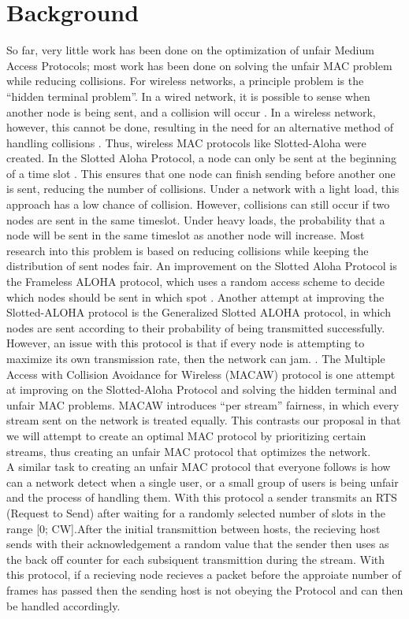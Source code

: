 \documentclass{sigcomm-alternate}
\begin{document}
\section{Background}
{
So far, very little work has been done on the optimization of unfair Medium Access Protocols; most work has been done on solving the unfair MAC problem while reducing collisions. For wireless networks, a principle problem is the “hidden terminal problem”. In a wired network, it is possible to sense when another node is being sent, and a collision will occur \cite{869217}. In a wireless network, however, this cannot be done, resulting in the need for an alternative method of handling collisions \cite{6574961}. Thus, wireless MAC protocols like Slotted-Aloha were created.  In the Slotted Aloha Protocol, a node can only be sent at the beginning of a time slot \cite{5340799}. This ensures that one node can finish sending before another one is sent, reducing the number of collisions.  Under a network with a light load, this approach has a low chance of collision. However, collisions can still occur if two nodes are sent in the same timeslot. Under heavy loads, the probability that a node will be sent in the same timeslot as another node will increase. Most research into this problem is based on reducing collisions while keeping the distribution of sent nodes fair.  An improvement on the Slotted Aloha Protocol is the Frameless ALOHA protocol, which uses a random access scheme to decide which nodes should be sent in which spot \cite{6336861}. Another attempt at improving the Slotted-ALOHA protocol is the Generalized Slotted ALOHA protocol, in which nodes are sent according to their probability of being transmitted successfully. However, an issue with this protocol is that if every node is attempting to maximize its own transmission rate, then the network can jam. \cite{4548143 }.  The Multiple Access with Collision Avoidance for Wireless (MACAW) protocol is one attempt at improving on the Slotted-Aloha Protocol and solving the hidden terminal and unfair MAC problems. MACAW introduces “per stream” fairness, in which every stream sent on the network is treated equally. This contrasts our proposal in that we will attempt to create an optimal MAC protocol by prioritizing certain streams, thus creating an unfair MAC protocol that optimizes the network.\\

A similar task to creating an unfair MAC protocol that everyone follows is how can a network detect when a single user, or a small group of users is being unfair and the process of handling them. With this protocol a sender transmits an RTS (Request to Send) after waiting for a randomly selected number of slots in the range [0; CW].After the initial transmittion between hosts, the recieving host sends with their acknowledgement a random value that the sender then uses as the back off counter for each subsiquent transmittion during the stream. \cite{Kyasanur} With this protocol, if a recieving node recieves a packet before the approiate number of frames has passed then the sending host is not obeying the Protocol and can then be handled accordingly.
}
\end{document}
